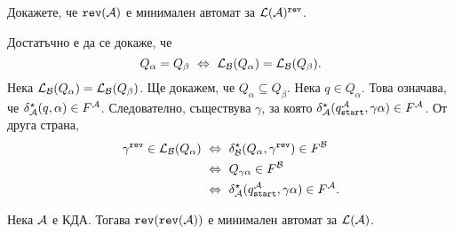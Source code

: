 \begin{problem}
  Докажете, че $\texttt{rev}(\mathcal{A})$ е минимален автомат за $\mathcal{L}(\mathcal{A})^{\texttt{rev}}$.
\end{problem}
\begin{hint}
  Достатъчно е да се докаже, че
  \[Q_\alpha = Q_\beta \ \Leftrightarrow\  \mathcal{L}_{\mathcal{B}}(Q_\alpha) = \mathcal{L}_{\mathcal{B}}(Q_\beta).\]
  Нека $\mathcal{L}_{\mathcal{B}}(Q_\alpha) = \mathcal{L}_{\mathcal{B}}(Q_\beta)$. Ще докажем, че $Q_\alpha \subseteq Q_\beta$.
  Нека $q \in Q_\alpha$. Това означава, че $\delta^\star_{\mathcal{A}}(q,\alpha) \in F^{\mathcal{A}}$.
  Следователно, съществува $\gamma$, за която $\delta^\star_{\mathcal{A}}(q_{\texttt{start}}^{\mathcal{A}},\gamma\alpha) \in F^{\mathcal{A}}$.
  От друга страна,
  \begin{align*}
    \gamma^{\texttt{rev}} \in \mathcal{L}_{\mathcal{B}}(Q_\alpha) & \ \Leftrightarrow\  \delta^\star_{\mathcal{B}}(Q_\alpha,\gamma^{\texttt{rev}}) \in F^{\mathcal{B}}\\
                                    & \ \Leftrightarrow\  Q_{\gamma\alpha} \in F^{\mathcal{B}}\\
                                    & \ \Leftrightarrow\  \delta^\star_{\mathcal{A}}(q_{\texttt{start}}^{\mathcal{A}},\gamma\alpha) \in F^{\mathcal{A}}.
  \end{align*}
\end{hint}


\begin{framed}
  \begin{theorem}[Бжозовски]
    Нека $\mathcal{A}$ е КДА. Тогава $\texttt{rev}(\texttt{rev}(\mathcal{A}))$ е минимален автомат за $\mathcal{L}(\mathcal{A})$.
  \end{theorem}
\end{framed}



